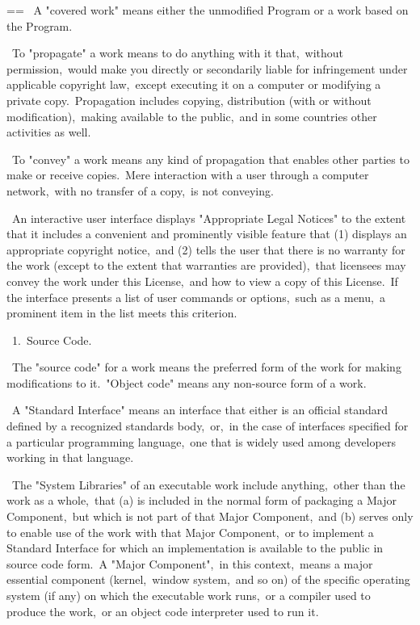 \documentclass{book}
\makeatletter
\newenvironment{Texinfopreformatted}{%
  \par\GNUTobeylines\obeyspaces\frenchspacing\parskip=\z@\parindent=\z@}{}
{\catcode`\^^M=13 \gdef\GNUTobeylines{\catcode`\^^M=13 \def^^M{\null\par}}}
\newenvironment{Texinfoindented}{\begin{list}{}{}\item\relax}{\end{list}}
\renewcommand{\_}{\Texinfounderscore\discretionary{}{}{}}
\makeatother
\begin{document}
\begin{Texinfoindented}
\begin{Texinfopreformatted}
\  A "covered work" means either the unmodified Program or a work based
on the Program.

\  To "propagate" a work means to do anything with it that,\ without
permission,\ would make you directly or secondarily liable for
infringement under applicable copyright law,\ except executing it on a
computer or modifying a private copy.\  Propagation includes copying,
distribution (with or without modification),\ making available to the
public,\ and in some countries other activities as well.

\  To "convey" a work means any kind of propagation that enables other
parties to make or receive copies.\  Mere interaction with a user through
a computer network,\ with no transfer of a copy,\ is not conveying.

\  An interactive user interface displays "Appropriate Legal Notices"
to the extent that it includes a convenient and prominently visible
feature that (1) displays an appropriate copyright notice,\ and (2)
tells the user that there is no warranty for the work (except to the
extent that warranties are provided),\ that licensees may convey the
work under this License,\ and how to view a copy of this License.\  If
the interface presents a list of user commands or options,\ such as a
menu,\ a prominent item in the list meets this criterion.

\  1.\ Source Code.

\  The "source code" for a work means the preferred form of the work
for making modifications to it.\  "Object code" means any non-source
form of a work.

\  A "Standard Interface" means an interface that either is an official
standard defined by a recognized standards body,\ or,\ in the case of
interfaces specified for a particular programming language,\ one that
is widely used among developers working in that language.

\  The "System Libraries" of an executable work include anything,\ other
than the work as a whole,\ that (a) is included in the normal form of
packaging a Major Component,\ but which is not part of that Major
Component,\ and (b) serves only to enable use of the work with that
Major Component,\ or to implement a Standard Interface for which an
implementation is available to the public in source code form.\  A
"Major Component",\ in this context,\ means a major essential component
(kernel,\ window system,\ and so on) of the specific operating system
(if any) on which the executable work runs,\ or a compiler used to
produce the work,\ or an object code interpreter used to run it.


\end{Texinfopreformatted}
\end{Texinfoindented}
\end{document}
